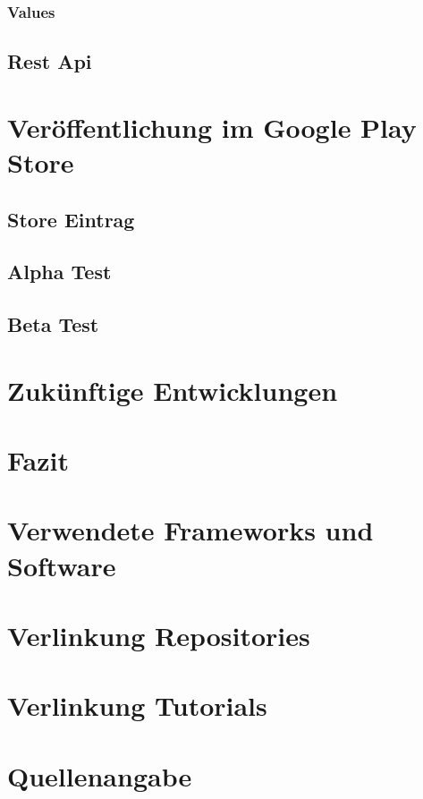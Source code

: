 \documentclass{scrartcl}
\begin{document}
\subsubsection{Values}

\subsection{Rest Api}


\newpage

\section{Veröffentlichung im Google Play Store}

\subsection{Store Eintrag}

\subsection{Alpha Test}

\subsection{Beta Test}


\newpage

\section{Zukünftige Entwicklungen}


\newpage

\section{Fazit}


\newpage

\section{Verwendete Frameworks und Software}


\newpage

\section{Verlinkung Repositories}


\newpage

\section{Verlinkung Tutorials}


\newpage

\section{Quellenangabe}
\end{document}
